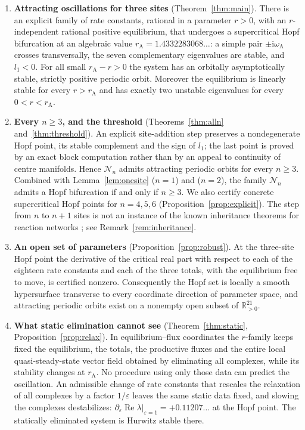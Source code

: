\documentclass[11pt,a4paper]{article}
\theoremstyle{plain}
\theoremstyle{definition}
\theoremstyle{remark}
\newcommand{\R}{\mathbb R}
\newcommand{\ii}{\mathrm i}
\newcommand{\cN}{\mathcal N}
\newcommand{\rA}{r_{\mathrm A}}
\newcommand{\omA}{\omega_{\mathrm A}}
\DeclareMathOperator{\Ree}{Re}
\begin{document}
\begin{enumerate}[label=(\roman*),leftmargin=*]
\item \textbf{Attracting oscillations for three sites} (Theorem~\ref{thm:main}). There is an explicit family of rate constants, rational in a parameter $r>0$, with an $r$-independent rational positive equilibrium, that undergoes a supercritical Hopf bifurcation at an algebraic value $\rA=1.4332283068\ldots$: a simple pair $\pm\ii\omA$ crosses transversally, the seven complementary eigenvalues are stable, and $l_1<0$. For all small $\rA-r>0$ the system has an orbitally asymptotically stable, strictly positive periodic orbit. Moreover the equilibrium is linearly stable for every $r>\rA$ and has exactly two unstable eigenvalues for every $0<r<\rA$.
\item \textbf{Every $n\ge3$, and the threshold} (Theorems~\ref{thm:alln} and~\ref{thm:threshold}). An explicit site-addition step preserves a nondegenerate Hopf point, its stable complement and the sign of $l_1$; the last point is proved by an exact block computation rather than by an appeal to continuity of centre manifolds. Hence $\cN_n$ admits attracting periodic orbits for every $n\ge3$. Combined with Lemma~\ref{lem:onesite} ($n=1$) and \cite[Theorem~5.8]{Vassena26} ($n=2$), the family $\cN_n$ admits a Hopf bifurcation if and only if $n\ge3$. We also certify concrete supercritical Hopf points for $n=4,5,6$ (Proposition~\ref{prop:explicit}). The step from $n$ to $n+1$ sites is not an instance of the known inheritance theorems for reaction networks \cite{Banaji18,BanajiBorosHofbauer25}; see Remark~\ref{rem:inheritance}.
\item \textbf{An open set of parameters} (Proposition~\ref{prop:robust}). At the three-site Hopf point the derivative of the critical real part with respect to each of the eighteen rate constants and each of the three totals, with the equilibrium free to move, is certified nonzero. Consequently the Hopf set is locally a smooth hypersurface transverse to every coordinate direction of parameter space, and attracting periodic orbits exist on a nonempty open subset of $\R^{21}_{>0}$.
\item \textbf{What static elimination cannot see} (Theorem~\ref{thm:static}, Proposition~\ref{prop:relax}). In equilibrium--flux coordinates the $r$-family keeps fixed the equilibrium, the totals, the productive fluxes and the entire local quasi-steady-state vector field obtained by eliminating all complexes, while its stability changes at $\rA$. No procedure using only those data can predict the oscillation. An admissible change of rate constants that rescales the relaxation of all complexes by a factor $1/\varepsilon$ leaves the same static data fixed, and slowing the complexes destabilizes: $\partial_\varepsilon\Ree\lambda|_{\varepsilon=1}=+0.11207\ldots$ at the Hopf point. The statically eliminated system is Hurwitz stable there.

\end{enumerate}
\end{document}
